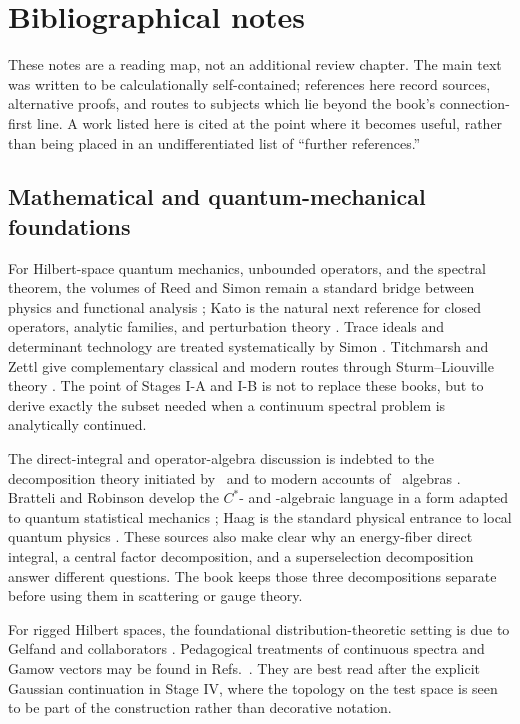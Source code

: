 \chapter{Bibliographical notes}
\label{chap:bibliographical-notes}

These notes are a reading map, not an additional review chapter.  The main
text was written to be calculationally self-contained; references here record
sources, alternative proofs, and routes to subjects which lie beyond the
book's connection-first line.  A work listed here is cited at the point where
it becomes useful, rather than being placed in an undifferentiated list of
``further references.''

\section*{Mathematical and quantum-mechanical foundations}

For Hilbert-space quantum mechanics, unbounded operators, and the spectral
theorem, the volumes of Reed and Simon remain a standard bridge between
physics and functional analysis \cite{ReedSimonI:1980}; Kato is the natural
next reference for closed operators, analytic families, and perturbation
theory \cite{Kato:1995}.  Trace ideals and determinant technology are treated
systematically by Simon \cite{SimonTraceIdeals:2005}.  Titchmarsh and Zettl
give complementary classical and modern routes through Sturm--Liouville
theory \cite{Titchmarsh:1962,Zettl:2005}.  The point of Stages I-A and I-B is
not to replace these books, but to derive exactly the subset needed when a
continuum spectral problem is analytically continued.

The direct-integral and operator-algebra discussion is indebted to the
decomposition theory initiated by \vN\ and to modern accounts of \vN\
algebras \cite{vonNeumann:1949Reduction,Takesaki:2002}.  Bratteli and Robinson
develop the $C^*$- and \vN-algebraic language in a form adapted to quantum
statistical mechanics \cite{BratteliRobinsonI:1987}; Haag is the standard
physical entrance to local quantum physics \cite{Haag:1996}.  These sources
also make clear why an energy-fiber direct integral, a central factor
decomposition, and a superselection decomposition answer different
questions.  The book keeps those three decompositions separate before using
them in scattering or gauge theory.

For rigged Hilbert spaces, the foundational distribution-theoretic setting
is due to Gelfand and collaborators \cite{Gelfand:1964}.  Pedagogical
treatments of continuous spectra and Gamow vectors may be found in
Refs.~\cite{DelaMadrid:2001wwa,DelaMadrid:2002cz}.  They are best read after
the explicit Gaussian continuation in Stage IV, where the topology on the
test space is seen to be part of the construction rather than decorative
notation.

